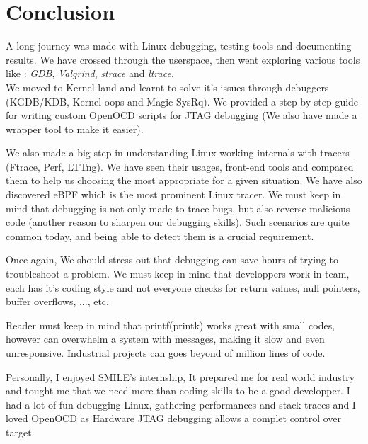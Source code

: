 \section{Conclusion}
{\Large A long journey was made with Linux debugging, testing tools and documenting results. We have crossed through the userspace, then went exploring various tools like : \emph{GDB}, \emph{Valgrind}, \emph{strace} and \emph{ltrace}.\\

We moved to Kernel-land and learnt to solve it's issues through debuggers (KGDB/KDB, Kernel oops and Magic SysRq). We provided a step by step guide for writing custom OpenOCD scripts for JTAG debugging (We also have made a wrapper tool to make it easier). 

We also made a big step in understanding Linux working internals with tracers (Ftrace, Perf, LTTng). We have seen their usages, front-end tools and compared them to help us choosing the most appropriate for a given situation. We have also discovered eBPF which is the most prominent Linux tracer.
\vspace{10px}
We must keep in mind that debugging is not only made to trace bugs, but also reverse malicious code (another reason to sharpen our debugging skills). Such scenarios are quite common today, and being able to detect them is a crucial requirement.

\vspace{5px}
Once again, We should stress out that debugging can save hours of trying to troubleshoot a problem. We must keep in mind that developpers work in team, each has it's coding style and not everyone checks for return values, null pointers, buffer overflows, ..., etc.



\vspace{7px}
Reader must keep in mind that printf(printk) works great with small codes, however can overwhelm a system with messages, making it slow and even unresponsive. Industrial projects can goes beyond of million lines of code.\\

}

\begin{center}
\color{red}
Personally, I enjoyed SMILE's internship, It prepared me for real world industry and tought me that we need more than coding skills to be a good developper.  I had a lot of fun debugging Linux, gathering performances and stack traces and I loved OpenOCD as Hardware JTAG debugging allows a complet control over target.
\end{center}



